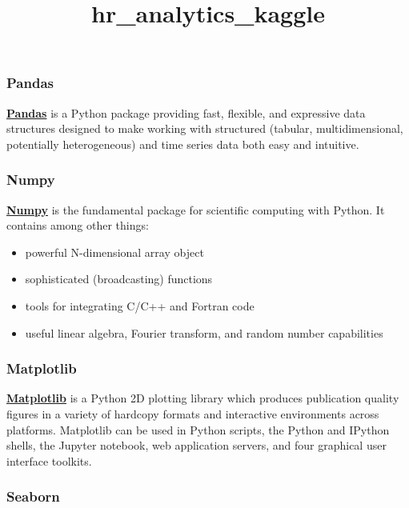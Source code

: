 \documentclass[11pt]{article}
\title{hr\_analytics\_kaggle}
\providecommand{\tightlist}{%
      \setlength{\itemsep}{0pt}\setlength{\parskip}{0pt}}
\begin{document}
    
    
    \maketitle
    
    

    
    \subsubsection{Pandas}\label{pandas}

\textbf{\href{https://pandas.pydata.org/pandas-docs/version/0.20/}{Pandas}}
is a Python package providing fast, flexible, and expressive data
structures designed to make working with structured (tabular,
multidimensional, potentially heterogeneous) and time series data both
easy and intuitive.

\subsubsection{Numpy}\label{numpy}

\textbf{\href{https://docs.scipy.org/doc/numpy/user/quickstart.html}{Numpy}}
is the fundamental package for scientific computing with Python. It
contains among other things:

\begin{itemize}
\tightlist
\item
  powerful N-dimensional array object
\item
  sophisticated (broadcasting) functions
\item
  tools for integrating C/C++ and Fortran code
\item
  useful linear algebra, Fourier transform, and random number
  capabilities
\end{itemize}

\subsubsection{Matplotlib}\label{matplotlib}

\textbf{\href{https://matplotlib.org/contents.html}{Matplotlib}} is a
Python 2D plotting library which produces publication quality figures in
a variety of hardcopy formats and interactive environments across
platforms. Matplotlib can be used in Python scripts, the Python and
IPython shells, the Jupyter notebook, web application servers, and four
graphical user interface toolkits.

\subsubsection{Seaborn}\label{seaborn}
\end{document}
